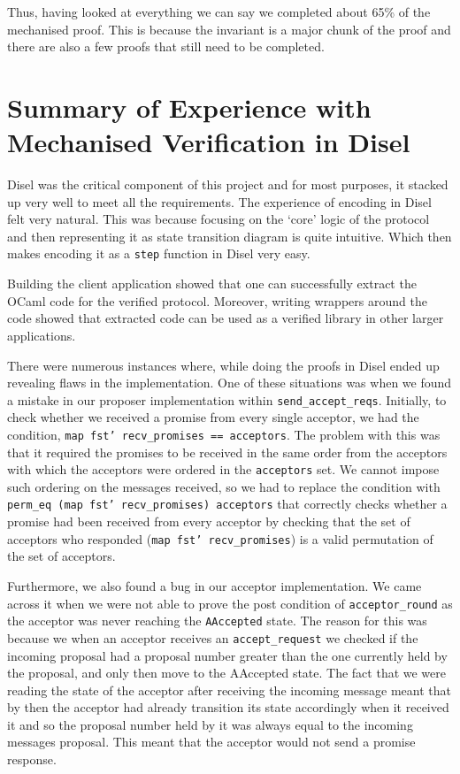 Thus, having looked at everything we can say we completed about 65\% of
the mechanised proof. This is because the invariant is a major chunk of
the proof and there are also a few proofs that still need to be completed.

\section{Summary of Experience with Mechanised Verification in Disel}
Disel was the critical component of this project and for most purposes, it
stacked up very well to meet all the requirements.
The experience of encoding in Disel felt very natural. This was because
focusing on the `core' logic of the protocol and then representing it
as state transition diagram is quite intuitive. Which then makes
encoding it as a \texttt{step} function in Disel very easy.

Building the client application showed that one can successfully extract
the OCaml code for the verified protocol. Moreover, writing wrappers
around the code showed that extracted code can be used as a verified library
in other larger applications.

There were numerous instances where, while doing the proofs in Disel
ended up revealing flaws in the implementation. One of these situations was
when we found a mistake in our proposer implementation within
\texttt{send\_accept\_reqs}. Initially, to check
whether we received a promise from every single acceptor, we had the condition,
\texttt{map fst' recv\_promises == acceptors}. The problem with this was that
it required the promises to be received in the same order from the acceptors
with which the acceptors were ordered in the \texttt{acceptors} set. We cannot impose
such ordering on the messages received, so we had to replace the condition
with \texttt{perm\_eq (map fst' recv\_promises) acceptors} that correctly checks
whether a promise had been received from every acceptor by checking that
the set of acceptors who responded (\texttt{map fst' recv\_promises}) is
a valid permutation of the set of acceptors.

Furthermore, we also found a bug in our acceptor implementation. We came
across it when we were not able to prove the post condition of \texttt{acceptor\_round}
as the acceptor was never reaching the \texttt{AAccepted} state.
The reason for this was because we when an acceptor receives an \texttt{accept\_request}
we checked if the incoming proposal had a proposal number greater than the one
currently held by the proposal, and only then move to the AAccepted state. The fact
that we were reading the state of the acceptor after receiving the incoming message
meant that by then the acceptor had already transition its state accordingly
when it received it and so the proposal number held by it was always
equal to the incoming messages proposal. This meant that the acceptor would not
send a promise response.

